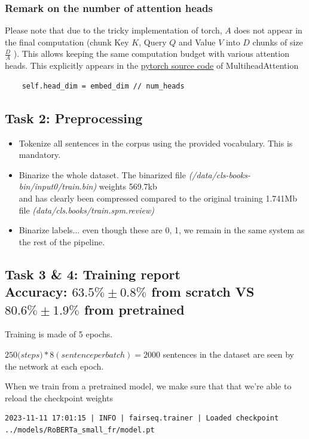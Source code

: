 \documentclass[a4paper]{article}
\begin{document}
\subsubsection*{Remark on the number of attention heads}
Please note that due to the tricky implementation of torch,
$A$ does not appear in the final computation (chunk Key $K$, Query $Q$ and Value $V$ into $D$ chunks of  size $\frac{D}{A}$ ).
This allows keeping the same computation budget with various attention heads.
This explicitly appears in the \href{https://github.com/pytorch/pytorch/blob/main/torch/nn/modules/activation.py#L990}{pytorch source code}
of MultiheadAttention
\begin{verbatim}
    self.head_dim = embed_dim // num_heads
\end{verbatim}

\subsection*{Task 2: Preprocessing}
\begin{itemize}
    \item Tokenize all sentences in the corpus using the provided vocabulary. This is mandatory.
    \item Binarize the whole dataset. The binarized file \textit{(/data/cls-books-bin/input0/train.bin)} weights 569.7kb \\
     and has clearly been compressed compared to the original training 1.741Mb file \textit{(data/cls.books/train.spm.review)}
    \item Binarize labels... even though these are 0, 1, we remain in the same system as the rest of the pipeline.
\end{itemize}



\subsection*{Task 3 \& 4: Training report \\ Accuracy: $63.5\%\pm0.8\%$ from scratch VS $80.6\%\pm1.9\%$ from pretrained}
Training is made of 5 epochs.

$250 \textit{(steps)}*8{(sentence per batch)}=2000$ sentences in the dataset are seen by the network at each epoch.

When we train from a pretrained model, we make sure that that we're able to reload the checkpoint weights
\begin{verbatim}
2023-11-11 17:01:15 | INFO | fairseq.trainer | Loaded checkpoint ../models/RoBERTa_small_fr/model.pt
\end{verbatim}
\end{document}
